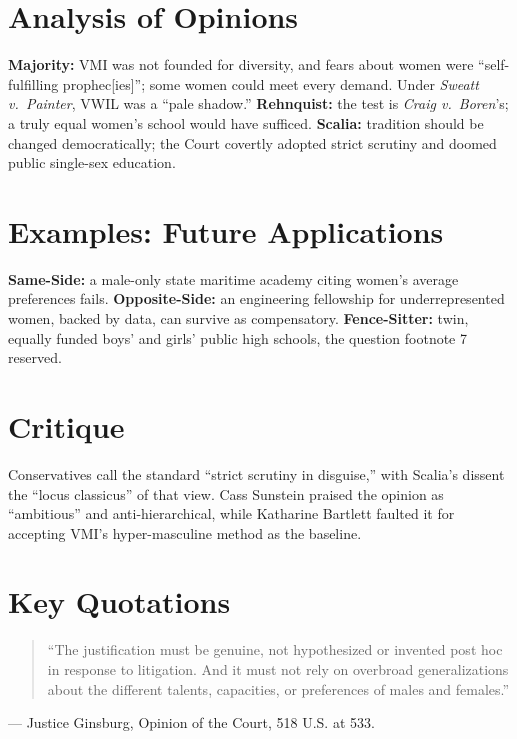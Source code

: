 \documentclass[12pt]{article}
\begin{document}
\section{Analysis of Opinions}
\textbf{Majority:} VMI was not founded for diversity, and fears about women were ``self-fulfilling prophec[ies]''; some women could meet every demand. Under \textit{Sweatt v.\ Painter}, VWIL was a ``pale shadow.'' \textbf{Rehnquist:} the test is \textit{Craig v.\ Boren}'s; a truly equal women's school would have sufficed. \textbf{Scalia:} tradition should be changed democratically; the Court covertly adopted strict scrutiny and doomed public single-sex education.

\section{Examples: Future Applications}
\textbf{Same-Side:} a male-only state maritime academy citing women's average preferences fails. \textbf{Opposite-Side:} an engineering fellowship for underrepresented women, backed by data, can survive as compensatory. \textbf{Fence-Sitter:} twin, equally funded boys' and girls' public high schools, the question footnote 7 reserved.

\section{Critique}
Conservatives call the standard ``strict scrutiny in disguise,'' with Scalia's dissent the ``locus classicus'' of that view. Cass Sunstein praised the opinion as ``ambitious'' and anti-hierarchical, while Katharine Bartlett faulted it for accepting VMI's hyper-masculine method as the baseline.

\section{Key Quotations}
\begin{quote}
``The justification must be genuine, not hypothesized or invented post hoc in response to litigation. And it must not rely on overbroad generalizations about the different talents, capacities, or preferences of males and females.''
\end{quote}
\noindent --- Justice Ginsburg, Opinion of the Court, 518 U.S. at 533.
\end{document}

